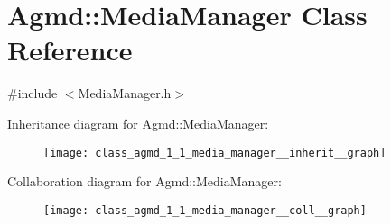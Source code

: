 \hypertarget{class_agmd_1_1_media_manager}{\section{Agmd\+:\+:Media\+Manager Class Reference}
\label{class_agmd_1_1_media_manager}
}


{\ttfamily \#include $<$Media\+Manager.\+h$>$}



Inheritance diagram for Agmd\+:\+:Media\+Manager\+:\nopagebreak
\begin{figure}[H]
\begin{center}
\leavevmode
\texttt{[image: class\_agmd\_1\_1\_media\_manager\_\_inherit\_\_graph]}
\end{center}
\end{figure}


Collaboration diagram for Agmd\+:\+:Media\+Manager\+:\nopagebreak
\begin{figure}[H]
\begin{center}
\leavevmode
\texttt{[image: class\_agmd\_1\_1\_media\_manager\_\_coll\_\_graph]}
\end{center}
\end{figure}
